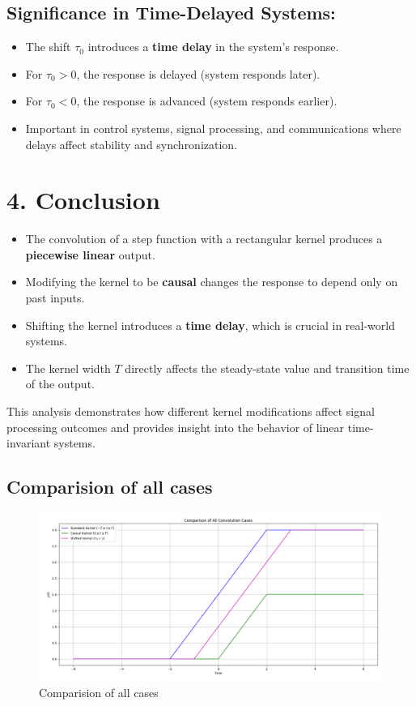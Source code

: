 \subsection*{Significance in Time-Delayed Systems:}
\begin{itemize}
    \item The shift \( \tau_0 \) introduces a \textbf{time delay} in the system's response.
    \item For \( \tau_0 > 0 \), the response is delayed (system responds later).
    \item For \( \tau_0 < 0 \), the response is advanced (system responds earlier).
    \item Important in control systems, signal processing, and communications where delays affect stability and synchronization.
\end{itemize}

\section*{4. Conclusion}

\begin{itemize}
    \item The convolution of a step function with a rectangular kernel produces a \textbf{piecewise linear} output.
    \item Modifying the kernel to be \textbf{causal} changes the response to depend only on past inputs.
    \item Shifting the kernel introduces a \textbf{time delay}, which is crucial in real-world systems.
    \item The kernel width \( T \) directly affects the steady-state value and transition time of the output.
\end{itemize}

This analysis demonstrates how different kernel modifications affect signal processing outcomes and provides insight into the behavior of linear time-invariant systems.
\subsection*{Comparision of all cases}
\begin{figure}[H]
    \centering
    \includegraphics[width=0.8\linewidth]{plotsstep/comparsionof123.png}
    \caption{Comparision of all cases}
    \label{fig:enter-label}
\end{figure}
